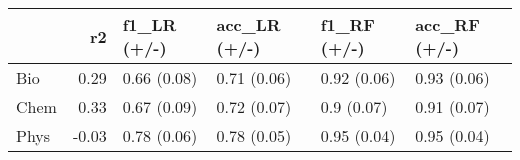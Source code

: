 \begin{tabular}{lrllll}
\toprule
{} &    r2 &  f1\_LR (+/-) & acc\_LR (+/-) &  f1\_RF (+/-) & acc\_RF (+/-) \\
\midrule
Bio    &  0.29 &  0.66 (0.08) &  0.71 (0.06) &  0.92 (0.06) &  0.93 (0.06) \\
Chem  &  0.33 &  0.67 (0.09) &  0.72 (0.07) &   0.9 (0.07) &  0.91 (0.07) \\
Phys    & -0.03 &  0.78 (0.06) &  0.78 (0.05) &  0.95 (0.04) &  0.95 (0.04) \\
\bottomrule
\end{tabular}
